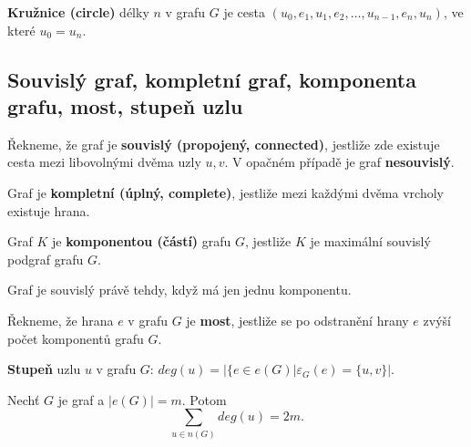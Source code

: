 \begin{definition}
\textbf{Kružnice (circle)} délky $n$ v grafu $G$ je cesta $(u_0, e_1, u_1, e_2, \ldots, u_{n-1}, e_n, u_n)$, ve které $u_0 = u_n$.
\end{definition}

\subsection{Souvislý graf, kompletní graf, komponenta grafu, most, stupeň uzlu}

\begin{definition}
Řekneme, že graf je \textbf{souvislý (propojený, connected)}, jestliže zde existuje cesta mezi libovolnými dvěma uzly $u,v$. V opačném případě je graf \textbf{nesouvislý}.
\end{definition}

\begin{definition}
Graf je \textbf{kompletní (úplný, complete)}, jestliže mezi každými dvěma vrcholy existuje hrana. 
\end{definition}

\begin{definition}
Graf $K$ je \textbf{komponentou (částí)} grafu $G$, jestliže $K$ je maximální souvislý podgraf grafu $G$.
\end{definition}

\begin{theorem}
Graf je souvislý právě tehdy, když má jen jednu komponentu.
\end{theorem}

\begin{definition}
Řekneme, že hrana $e$ v grafu $G$ je \textbf{most}, jestliže se po odstranění hrany $e$ zvýší počet komponentů grafu $G$.
\end{definition}

\begin{definition}
\textbf{Stupeň} uzlu $u$ v grafu $G$: $deg(u) = | \{e \in e(G) | \varepsilon_G (e) = \{ u, v \} |$.
\end{definition}

\begin{theorem}
Nechť $G$ je graf a $|e(G)| = m$. Potom
$$ \sum_{u \in n(G)} deg(u) = 2m.$$
\end{theorem}

